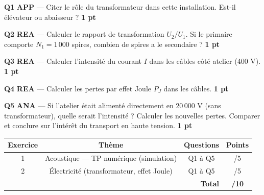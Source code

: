 \documentclass[a4paper,11pt]{article}
\newcommand{\pts}[1]{\hfill\textcolor{gris}{\small\textbf{#1}}}
\newcommand{\comp}[1]{\colorbox{blue!10}{\scriptsize\textbf{#1}}}
\begin{document}
\textbf{Q1} \comp{APP} — Citer le rôle du transformateur dans cette installation. Est-il élévateur ou abaisseur ? \pts{1 pt}

\begin{reponsebox}[2.5cm]
\end{reponsebox}

\textbf{Q2} \comp{REA} — Calculer le rapport de transformation $U_2/U_1$. Si le primaire comporte $N_1 = 1\,000$ spires, combien de spires a le secondaire ? \pts{1 pt}

\begin{reponsebox}[3cm]
\dotfill

\dotfill

\dotfill
\end{reponsebox}

\textbf{Q3} \comp{REA} — Calculer l'intensité du courant $I$ dans les câbles côté atelier (400 V). \pts{1 pt}

\begin{reponsebox}[3cm]
\dotfill

\dotfill

\dotfill
\end{reponsebox}

\textbf{Q4} \comp{REA} — Calculer les pertes par effet Joule $P_J$ dans les câbles. \pts{1 pt}

\begin{reponsebox}[3cm]
\dotfill

\dotfill

\dotfill
\end{reponsebox}

\textbf{Q5} \comp{ANA} — Si l'atelier était alimenté directement en 20\,000 V (sans transformateur), quelle serait l'intensité ? Calculer les nouvelles pertes. Comparer et conclure sur l'intérêt du transport en haute tension. \pts{1 pt}

\begin{reponsebox}[5cm]
\dotfill

\dotfill

\dotfill

\dotfill

\dotfill
\end{reponsebox}

\vfill

\begin{center}
\begin{tabular}{|c|c|c|c|}
\hline
\textbf{Exercice} & \textbf{Thème} & \textbf{Questions} & \textbf{Points} \\
\hline
1 & Acoustique — TP numérique (simulation) & Q1 à Q5 & /5 \\
\hline
2 & Électricité (transformateur, effet Joule) & Q1 à Q5 & /5 \\
\hline
\multicolumn{3}{|r|}{\textbf{Total}} & \textbf{/10} \\
\hline
\end{tabular}
\end{center}
\end{document}
